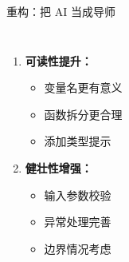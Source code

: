 \begin{frame}{重构：把 AI 当成导师}
\begin{columns}
\begin{enumerate}
			\item \textbf{可读性提升：}
			      \begin{itemize}
				      \item 变量名更有意义
				      \item 函数拆分更合理
				      \item 添加类型提示
			      \end{itemize}

			\item \textbf{健壮性增强：}
			      \begin{itemize}
				      \item 输入参数校验
				      \item 异常处理完善
				      \item 边界情况考虑
			      \end{itemize}
		\end{enumerate}
	\end{columns}
\end{frame}



